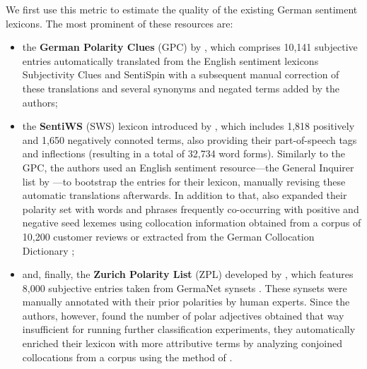 We first use this metric to estimate the quality of the existing
German sentiment lexicons.  The most prominent of these resources are:
\begin{itemize}
\item the \textbf{German Polarity Clues} (GPC) by
  \citet{Waltinger:10}, which comprises 10,141 subjective entries
  automatically translated from the English sentiment lexicons
  Subjectivity Clues \cite{Wilson:05} and SentiSpin \cite{Takamura:05}
  with a subsequent manual correction of these translations and
  several synonyms and negated terms added by the authors;

\item the \textbf{SentiWS} (SWS) lexicon introduced by
  \citet{Remus:10}, which includes 1,818 positively and 1,650
  negatively connoted terms, also providing their part-of-speech tags
  and inflections (resulting in a total of 32,734 word forms).
  Similarly to the GPC, the authors used an English sentiment
  resource---the General Inquirer list by \citet{Stone:66}---to
  bootstrap the entries for their lexicon, manually revising these
  automatic translations afterwards.  In addition to that,
  \citet{Remus:10} also expanded their polarity set with words and
  phrases frequently co-occurring with positive and negative seed
  lexemes using collocation information obtained from a corpus of
  10,200 customer reviews or extracted from the German Collocation
  Dictionary \cite{Quasthoff:10};

\item and, finally, the \textbf{Zurich Polarity List} (ZPL) developed
  by \citet{Clematide:10}, which features 8,000 subjective entries
  taken from GermaNet synsets \cite{Hamp:97}.  These synsets were
  manually annotated with their prior polarities by human experts.
  Since the authors, however, found the number of polar adjectives
  obtained that way insufficient for running further classification
  experiments, they automatically enriched their lexicon with more
  attributive terms by analyzing conjoined collocations from a corpus
  using the method of \citet{Hatzivassi:97}.
\end{itemize}

